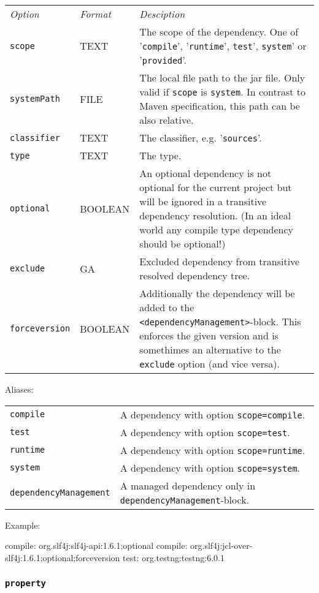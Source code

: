 \documentclass[a4paper,12pt,english,oneside,halfparskip]{scrartcl}
\newcommand{\code}[1]{\texttt{#1}}
\begin{document}
\begin{tabular}{llp{}}
\emph{Option} & \emph{Format} & \emph{Desciption} \\
\code{scope} & TEXT & The scope of the dependency. One of '\code{compile}', '\code{runtime}', \code{test}', \code{system}' or '\code{provided}'. \\
\code{systemPath} & FILE & The local file path to the jar file. Only valid if \code{scope} is \code{system}. In contrast to Maven specification, this path can be also relative. \\
\code{classifier} & TEXT & The classifier, e.g. '\code{sources}'. \\
\code{type} & TEXT &  The type. \\
\code{optional} & BOOLEAN & An optional dependency is not optional for the current project but will be ignored in a transitive dependency resolution. (In an ideal world any compile type dependency should be optional!) \\
\code{exclude} & GA & Excluded dependency from transitive resolved dependency tree. \\
\code{forceversion} & BOOLEAN & Additionally the dependency will be added to the \code{<dependencyManagement>}-block. This enforces the given version and is somethimes an alternative to the \code{exclude} option (and vice versa). \\
\end{tabular}

Aliases:

\begin{tabular}{ll}
\code{compile} &  A dependency with option \code{scope=compile}. \\
\code{test} & A dependency with option \code{scope=test}. \\
\code{runtime} & A dependency with option \code{scope=runtime}. \\
\code{system} & A dependency with option \code{scope=system}. \\
\code{\small dependencyManagement} &  A managed dependency only in \code{dependencyManagement}-block. \\
\end{tabular}

Example:
\begin{Cmdline}
compile: org.slf4j:slf4j-api:1.6.1;optional
compile: org.slf4j:jcl-over-slf4j:1.6.1;optional;forceversion
test: org.testng:testng:6.0.1
\end{Cmdline}


\subsubsection{\code{property}}
\end{document}
